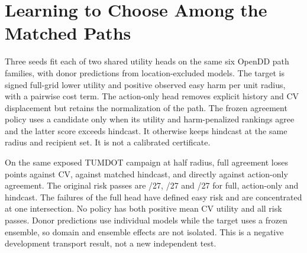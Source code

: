 \section{Learning to Choose Among the Matched Paths}
Three seeds fit each of two shared utility heads on the same six
OpenDD path families, with donor predictions from location-excluded
models. The target is signed full-grid lower utility and positive
observed easy harm per unit radius, with a pairwise cost term.
The action-only head removes explicit history and CV displacement
but retains the normalization of the path. The frozen agreement
policy uses a candidate only when its utility and harm-penalized
rankings agree and the latter score exceeds hindcast. It otherwise
keeps hindcast at the same radius and recipient set. It is not
a calibrated certificate.

On the same exposed TUMDOT campaign at half radius, full agreement
loses \PathChoiceCV{} points against CV, \PathChoiceHindcast{}
against matched hindcast, and \PathChoiceAblation{} directly against
action-only agreement. The original risk passes are \PathChoiceFull/27,
\PathChoiceSimple/27 and \PathChoiceHand/27 for full, action-only and
hindcast. The failures of the full head have defined easy risk and
are concentrated at one intersection. No policy has both positive
mean CV utility and all risk passes. Donor predictions use individual models while
the target uses a frozen ensemble, so domain and ensemble effects
are not isolated. This is a negative development transport result,
not a new independent test.
